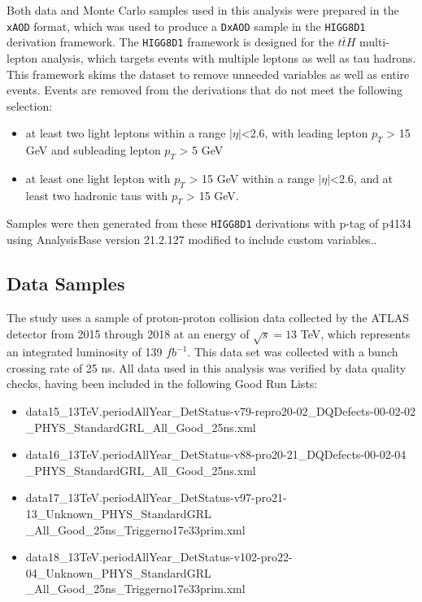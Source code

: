 
Both data and Monte Carlo samples used in this analysis were prepared in the \verb|xAOD| format, which was used to produce a \verb|DxAOD| sample in the \verb|HIGG8D1| derivation framework. The \verb|HIGG8D1| framework is designed for the $t\bar{t}H$ multi-lepton analysis, which targets events with multiple leptons as well as tau hadrons. This framework skims the dataset to remove unneeded variables as well as entire events. Events are removed from the derivations that do not meet the following selection:

\begin{itemize}
    \item at least two light leptons within a range $|\eta|$<2.6, with leading lepton $p_{T}$ > 15 GeV and subleading lepton $p_{T}$ > 5 GeV
    \item at least one light lepton with $p_{T}$ > 15 GeV within a range $|\eta|$<2.6, and at least two hadronic taus with $p_{T}$ > 15 GeV.
\end{itemize}

Samples were then generated from these \verb|HIGG8D1| derivations with p-tag of p4134 using AnalysisBase version 21.2.127 modified to include custom variables..

\subsection{Data Samples}

The study uses a sample of proton-proton collision data collected by the ATLAS detector from 2015 through 2018 at an energy of $\sqrt{s} = 13$ TeV, which represents an integrated luminosity of 139 $fb^{-1}$. This data set was collected with a bunch crossing rate of 25 ns. All data used in this analysis was verified by data quality checks, having been included in the following Good Run Lists: 
\begin{itemize}
    \item data15\_13TeV.periodAllYear\_DetStatus-v79-repro20-02\_DQDefects-00-02-02\\\_PHYS\_StandardGRL\_All\_Good\_25ns.xml
    \item data16\_13TeV.periodAllYear\_DetStatus-v88-pro20-21\_DQDefects-00-02-04\\\_PHYS\_StandardGRL\_All\_Good\_25ns.xml 
    \item data17\_13TeV.periodAllYear\_DetStatus-v97-pro21-13\_Unknown\_PHYS\_StandardGRL\\\_All\_Good\_25ns\_Triggerno17e33prim.xml 
    \item data18\_13TeV.periodAllYear\_DetStatus-v102-pro22-04\_Unknown\_PHYS\_StandardGRL\\\_All\_Good\_25ns\_Triggerno17e33prim.xml
\end{itemize}

